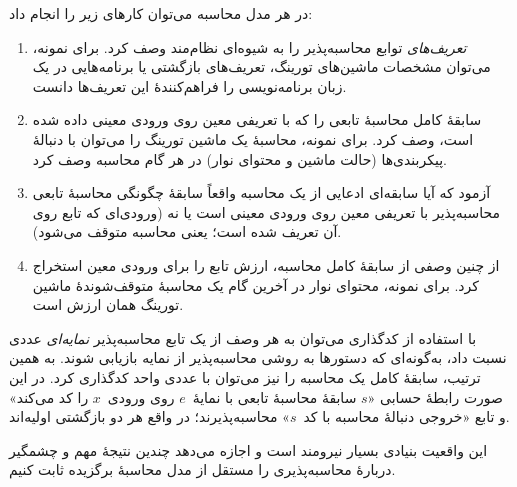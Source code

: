 \documentclass[../../../include/open-logic-section]{subfiles}
\begin{document}

در هر مدل محاسبه می‌توان کارهای زیر را انجام داد:
\begin{enumerate}
\item 
  \emph{تعریف‌های} توابع محاسبه‌پذیر را به شیوه‌ای نظام‌مند وصف کرد.
  برای نمونه، می‌توان مشخصات ماشین‌های تورینگ، تعریف‌های بازگشتی یا
  برنامه‌هایی در یک زبان برنامه‌نویسی را فراهم‌کنندهٔ این تعریف‌ها
  دانست.
\item سابقهٔ کامل محاسبهٔ تابعی را که با تعریفی معین روی ورودی معینی
  داده شده است، وصف کرد. برای نمونه، محاسبهٔ یک ماشین تورینگ را می‌توان
  با دنبالهٔ پیکربندی‌ها (حالت ماشین و محتوای نوار) در هر گام محاسبه
  وصف کرد.
\item آزمود که آیا سابقه‌ای ادعایی از یک محاسبه واقعاً سابقهٔ چگونگی
  محاسبهٔ تابعی محاسبه‌پذیر با تعریفی معین روی ورودی معینی است یا نه
  (ورودی‌ای که تابع روی آن تعریف شده است؛ یعنی محاسبه متوقف می‌شود).
\item از چنین وصفی از سابقهٔ کامل محاسبه، ارزش تابع را برای ورودی معین
  استخراج کرد. برای نمونه، محتوای نوار در آخرین گام یک محاسبهٔ
  متوقف‌شوندهٔ ماشین تورینگ همان ارزش است.
\end{enumerate}

با استفاده از کدگذاری می‌توان به هر وصف از یک تابع محاسبه‌پذیر
\emph{نمایه‌ای} عددی نسبت داد، به‌گونه‌ای که دستورها به روشی
محاسبه‌پذیر از نمایه بازیابی شوند. به همین ترتیب، سابقهٔ کامل یک
محاسبه را نیز می‌توان با عددی واحد کدگذاری کرد. در این صورت رابطهٔ
حسابی «$s$ سابقهٔ محاسبهٔ تابعی با نمایهٔ~$e$ روی ورودی~$x$ را کد
می‌کند» و تابع «خروجی دنبالهٔ محاسبه با کد~$s$» محاسبه‌پذیرند؛ در واقع
هر دو بازگشتی اولیه‌اند.

این واقعیت بنیادی بسیار نیرومند است و اجازه می‌دهد چندین نتیجهٔ مهم و
چشمگیر دربارهٔ محاسبه‌پذیری را مستقل از مدل محاسبهٔ برگزیده ثابت کنیم.
\end{document}
